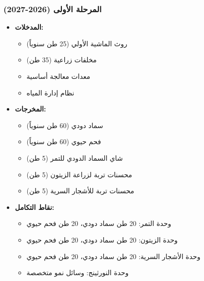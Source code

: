 \subsubsection{المرحلة الأولى (2026-2027)}
\begin{itemize}
    \item \textbf{المدخلات:}
    \begin{itemize}
        \item روث الماشية الأولي (25 طن سنوياً)
        \item مخلفات زراعية (35 طن)
        \item معدات معالجة أساسية
        \item نظام إدارة المياه
    \end{itemize}
    \item \textbf{المخرجات:}
    \begin{itemize}
        \item سماد دودي (60 طن سنوياً)
        \item فحم حيوي (60 طن سنوياً)
        \item شاي السماد الدودي للتمر (5 طن)
        \item محسنات تربة لزراعة الزيتون (5 طن)
        \item محسنات تربة للأشجار السرية (5 طن)
    \end{itemize}
    \item \textbf{نقاط التكامل:}
    \begin{itemize}
        \item وحدة التمر: 20 طن سماد دودي، 20 طن فحم حيوي
        \item وحدة الزيتون: 20 طن سماد دودي، 20 طن فحم حيوي
        \item وحدة الأشجار السرية: 20 طن سماد دودي، 20 طن فحم حيوي
        \item وحدة النورثينج: وسائل نمو متخصصة
    \end{itemize}
\end{itemize}

